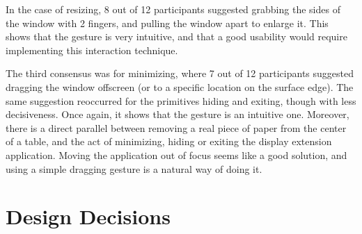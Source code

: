 In the case of resizing, 8 out of 12 participants suggested grabbing the sides of the window with 2 fingers, and pulling the window apart to enlarge it.
This shows that the gesture is very intuitive, and that a good usability would require implementing this interaction technique.

The third consensus was for minimizing, where 7 out of 12 participants suggested dragging the window offscreen (or to a specific location on the surface edge).
The same suggestion reoccurred for the primitives hiding and exiting, though with less decisiveness.
Once again, it shows that the gesture is an intuitive one.
Moreover, there is a direct parallel between removing a real piece of paper from the center of a table, and the act of minimizing, hiding or exiting the display extension application.
Moving the application out of focus seems like a good solution, and using a simple dragging gesture is a natural way of doing it.

%
%
%
%
%

\section{Design Decisions}

